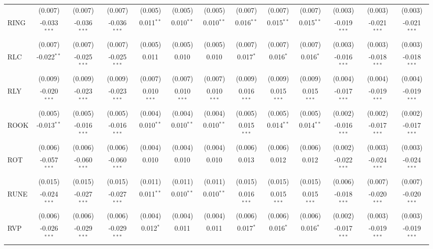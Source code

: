 \begin{table}[!htbp]
\begin{tabular}{@{\extracolsep{5pt}}lcccccccccccc}
  & (0.007) & (0.007) & (0.007) & (0.005) & (0.005) & (0.005) & (0.007) & (0.007) & (0.007) & (0.003) & (0.003) & (0.003) \\
 RING & -0.033$^{***}$ & -0.036$^{***}$ & -0.036$^{***}$ & 0.011$^{**}$ & 0.010$^{**}$ & 0.010$^{**}$ & 0.016$^{**}$ & 0.015$^{**}$ & 0.015$^{**}$ & -0.019$^{***}$ & -0.021$^{***}$ & -0.021$^{***}$ \\
  & (0.007) & (0.007) & (0.007) & (0.005) & (0.005) & (0.005) & (0.007) & (0.007) & (0.007) & (0.003) & (0.003) & (0.003) \\
 RLC & -0.022$^{**}$ & -0.025$^{***}$ & -0.025$^{***}$ & 0.011$^{}$ & 0.010$^{}$ & 0.010$^{}$ & 0.017$^{*}$ & 0.016$^{*}$ & 0.016$^{*}$ & -0.016$^{***}$ & -0.018$^{***}$ & -0.018$^{***}$ \\
  & (0.009) & (0.009) & (0.009) & (0.007) & (0.007) & (0.007) & (0.009) & (0.009) & (0.009) & (0.004) & (0.004) & (0.004) \\
 RLY & -0.020$^{***}$ & -0.023$^{***}$ & -0.023$^{***}$ & 0.010$^{***}$ & 0.010$^{***}$ & 0.010$^{***}$ & 0.016$^{***}$ & 0.015$^{***}$ & 0.015$^{***}$ & -0.017$^{***}$ & -0.019$^{***}$ & -0.019$^{***}$ \\
  & (0.005) & (0.005) & (0.005) & (0.004) & (0.004) & (0.004) & (0.005) & (0.005) & (0.005) & (0.002) & (0.002) & (0.002) \\
 ROOK & -0.013$^{**}$ & -0.016$^{***}$ & -0.016$^{***}$ & 0.010$^{**}$ & 0.010$^{**}$ & 0.010$^{**}$ & 0.015$^{***}$ & 0.014$^{**}$ & 0.014$^{**}$ & -0.016$^{***}$ & -0.017$^{***}$ & -0.017$^{***}$ \\
  & (0.006) & (0.006) & (0.006) & (0.004) & (0.004) & (0.004) & (0.006) & (0.006) & (0.006) & (0.002) & (0.003) & (0.003) \\
 ROT & -0.057$^{***}$ & -0.060$^{***}$ & -0.060$^{***}$ & 0.010$^{}$ & 0.010$^{}$ & 0.010$^{}$ & 0.013$^{}$ & 0.012$^{}$ & 0.012$^{}$ & -0.022$^{***}$ & -0.024$^{***}$ & -0.024$^{***}$ \\
  & (0.015) & (0.015) & (0.015) & (0.011) & (0.011) & (0.011) & (0.015) & (0.015) & (0.015) & (0.006) & (0.007) & (0.007) \\
 RUNE & -0.024$^{***}$ & -0.027$^{***}$ & -0.027$^{***}$ & 0.011$^{**}$ & 0.010$^{**}$ & 0.010$^{**}$ & 0.016$^{***}$ & 0.015$^{***}$ & 0.015$^{***}$ & -0.018$^{***}$ & -0.020$^{***}$ & -0.020$^{***}$ \\
  & (0.006) & (0.006) & (0.006) & (0.004) & (0.004) & (0.004) & (0.006) & (0.006) & (0.006) & (0.002) & (0.003) & (0.003) \\
 RVP & -0.026$^{***}$ & -0.029$^{***}$ & -0.029$^{***}$ & 0.012$^{*}$ & 0.011$^{}$ & 0.011$^{}$ & 0.017$^{*}$ & 0.016$^{*}$ & 0.016$^{*}$ & -0.017$^{***}$ & -0.019$^{***}$ & -0.019$^{***}$ \\

\end{tabular}
\end{table}
